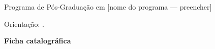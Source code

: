 \documentclass[12pt,openany,oneside,a4paper,brazil,chapter=TITLE]{abntex2}
\begin{document}
\frenchspacing
\hypersetup{pageanchor=false}
\begin{capa}
\begin{center}
\imprimirinstituicao\par
Programa de Pós-Graduação em [nome do programa --- preencher]\par
\vspace{2cm}
\imprimirautor\par
\vfill
\textbf{\MakeUppercase{\imprimirtitulo}}\par
\vfill
\imprimirlocal\par
\imprimirdata
\end{center}
\end{capa}
\setcounter{page}{1}
\begin{folhaderosto}
\begin{center}
\imprimirautor\par
\vfill
\textbf{\imprimirtitulo}\par
\vfill
\end{center}
\noindent\hspace*{0.5\textwidth}\begin{minipage}{0.5\textwidth}
\SingleSpacing
\imprimirpreambulo\par\vspace{\baselineskip}
Orientação: \imprimirorientador.
\end{minipage}
\vfill
\begin{center}\imprimirlocal\par\imprimirdata\end{center}
\end{folhaderosto}
\thispagestyle{empty}\vspace*{\fill}
\begin{center}\begin{minipage}{0.8\textwidth}\SingleSpacing
\textbf{Ficha catalográfica}\par
[Inserir a ficha emitida pelo serviço de catalogação da instituição após a confirmação dos dados autorais e da versão final.]
\end{minipage}\end{center}
\vspace*{\fill}\clearpage\addtocounter{page}{-1}
\end{document}
